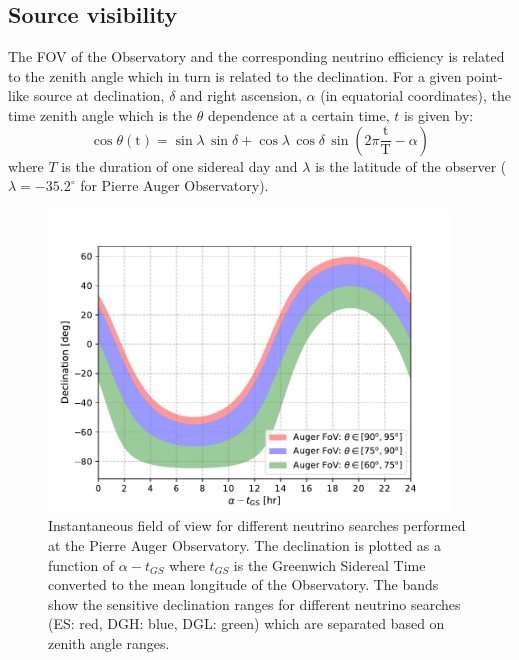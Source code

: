 \subsection{Source visibility}
\label{subsec:psource_coverage}
The \gls{FOV} of the Observatory and the corresponding neutrino efficiency is related to the zenith angle which in turn is related to the declination. For a given point-like source at declination, $\delta$ and right ascension, $\alpha$ (in equatorial coordinates), the time zenith angle which is the $\theta$ dependence at a certain time, $t$ is given by:
\begin{equation}
  \label{eq:zenith_angle_time}
  \cos \theta(\text{t}) = \sin \lambda \,\sin \delta+ \cos \lambda \, \cos \delta \,\sin (2\pi \frac{\text{t}}{\text{T}} - \alpha)
\end{equation} 
where $T$ is the duration of one sidereal day and $\lambda$ is the latitude of the observer ($\lambda = -35.2^{\circ}$ for Pierre Auger Observatory). 

\begin{figure}[t!]
  \centering
  \includegraphics[width=0.95\textwidth]{thesis_figures/PointLimits/Auger_FoV_1.pdf}
  \caption{Instantaneous field of view for different neutrino searches performed at the Pierre Auger Observatory. The declination is plotted as a function of $\alpha - t_{GS}$ where $t_{GS}$ is the Greenwich Sidereal Time converted to the mean longitude of the Observatory. The bands show the sensitive declination ranges for different neutrino searches (ES: red, DGH: blue, DGL: green) which are separated based on zenith angle ranges.}
  \label{fig:Auger_FoV}
\end{figure}

